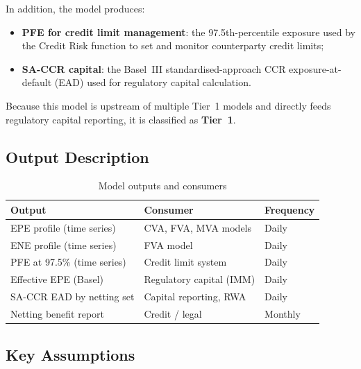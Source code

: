 \documentclass[11pt,a4paper]{article}
\begin{document}
In addition, the model produces:

\begin{itemize}[noitemsep]
  \item \textbf{PFE for credit limit management}: the 97.5th-percentile
        exposure used by the Credit Risk function to set and monitor
        counterparty credit limits;
  \item \textbf{SA-CCR capital}: the Basel~III standardised-approach CCR
        exposure-at-default (EAD) used for regulatory capital calculation.
\end{itemize}

Because this model is upstream of multiple Tier~1 models and directly feeds
regulatory capital reporting, it is classified as \textbf{Tier~1}.

\subsection{Output Description}

\begin{table}[h!]
\centering
\begin{tabular}{@{}lll@{}}
\toprule
\textbf{Output} & \textbf{Consumer} & \textbf{Frequency} \\
\midrule
EPE profile (time series) & CVA, FVA, MVA models       & Daily \\
ENE profile (time series) & FVA model                   & Daily \\
PFE at 97.5\% (time series) & Credit limit system       & Daily \\
Effective EPE (Basel)       & Regulatory capital (IMM)  & Daily \\
SA-CCR EAD by netting set   & Capital reporting, RWA    & Daily \\
Netting benefit report      & Credit / legal            & Monthly \\
\bottomrule
\end{tabular}
\caption{Model outputs and consumers}
\end{table}

\subsection{Key Assumptions}
\end{document}
